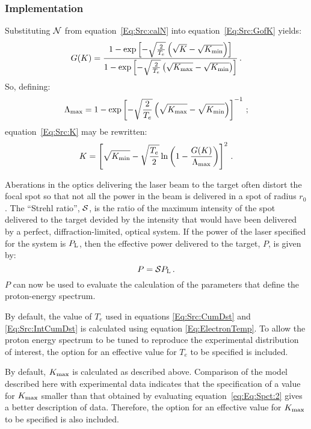 \subsubsection{Implementation}
Substituting ${\cal N}$ from equation~\ref{Eq:Src:calN} into
equation~\ref{Eq:Src:GofK} yields:
\begin{equation}
  G(K) =
  \frac{1-\exp\left[-\sqrt{\frac{2}{T_e}}\left(\sqrt{K}-\sqrt{K_{\rm min}}\right)\right]}
       {1-\exp\left[-\sqrt{\frac{2}{T_e}}\left(\sqrt{K_{\rm max}}-\sqrt{K_{\rm min}}\right)\right]}\,.
  \label{Eq:Src:CumDst}
\end{equation}
So, defining:
\begin{equation}
  \Lambda_{\rm max} =
       1-\exp\left[-\sqrt{\frac{2}{T_e}}\left(\sqrt{K_{\rm max}}-\sqrt{K_{\rm min}}\right)\right]^{-1}\,;
  \label{Eq:Src:IntCumDst}
\end{equation}
equation~\ref{Eq:Src:K} may be rewritten:
\begin{equation}
  K = \left[ \sqrt{K_{\rm min}} - \sqrt{\frac{T_e}{2}}
             \ln \left( 1 - \frac{G(K)}{\Lambda_{\rm max}} \right)
      \right]^2 \, .
\end{equation}

Aberations in the optics delivering the laser beam to the target often
distort the focal spot so that not all the power in the beam is
delivered in a spot of radius $r_0$.
The ``Strehl ratio'', ${\cal S}$, is the ratio of the maximum
intensity of the spot delivered to the target devided by the intensity
that would have been delivered by a perfect, diffraction-limited,
optical system. 
If the power of the laser specified for the system is $P_{\rm L}$,
then the effective power delivered to the target, $P$, is given by:
\begin{equation}
  P = {\cal S} P_{\rm L} \, .
\end{equation}
$P$ can now be used to evaluate the calculation of the parameters that
define the proton-energy spectrum.

By default, the value of $T_e$ used in equations \ref{Eq:Src:CumDst}
and \ref{Eq:Src:IntCumDst} is calculated using equation
\ref{Eq:ElectronTemp}. 
To allow the proton energy spectrum to be tuned to reproduce the
experimental distribution of interest, the option for an effective
value for $T_e$ to be specified is included.

By default, $K_{\rm max}$ is calculated as described above.
Comparison of the model described here with experimental data
indicates that the specification of a value for $K_{\rm max}$ smaller
than that obtained by evaluating equation~\ref{eq:Eq:Spct:2} gives a
better description of data.
Therefore, the option for an effective value for $K_{\rm max}$ to be
specified is also included.

